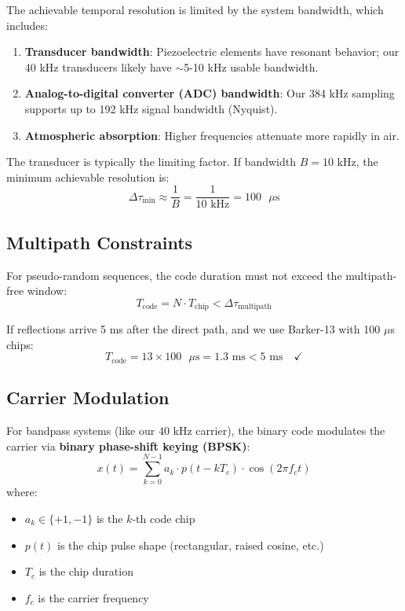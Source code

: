 \documentclass[11pt]{article}
\begin{document}
The achievable temporal resolution is limited by the system bandwidth, which includes:
\begin{enumerate}
    \item \textbf{Transducer bandwidth}: Piezoelectric elements have resonant behavior; our 40 kHz transducers likely have $\sim$5-10 kHz usable bandwidth.
    \item \textbf{Analog-to-digital converter (ADC) bandwidth}: Our 384 kHz sampling supports up to 192 kHz signal bandwidth (Nyquist).
    \item \textbf{Atmospheric absorption}: Higher frequencies attenuate more rapidly in air.
\end{enumerate}

The transducer is typically the limiting factor. If bandwidth $B = 10$ kHz, the minimum achievable resolution is:
\begin{equation}
\Delta \tau_{\min} \approx \frac{1}{B} = \frac{1}{10\text{ kHz}} = 100 \text{ }\mu\text{s}
\end{equation}

\subsection{Multipath Constraints}

For pseudo-random sequences, the code duration must not exceed the multipath-free window:
\begin{equation}
T_{\text{code}} = N \cdot T_{\text{chip}} < \Delta \tau_{\text{multipath}}
\end{equation}

If reflections arrive 5 ms after the direct path, and we use Barker-13 with 100 $\mu$s chips:
\begin{equation}
T_{\text{code}} = 13 \times 100 \text{ }\mu\text{s} = 1.3 \text{ ms} < 5 \text{ ms} \quad \checkmark
\end{equation}

\subsection{Carrier Modulation}

For bandpass systems (like our 40 kHz carrier), the binary code modulates the carrier via \textbf{binary phase-shift keying (BPSK)}:
\begin{equation}
x(t) = \sum_{k=0}^{N-1} a_k \cdot p(t - kT_c) \cdot \cos(2\pi f_c t)
\end{equation}
where:
\begin{itemize}
    \item $a_k \in \{+1, -1\}$ is the $k$-th code chip
    \item $p(t)$ is the chip pulse shape (rectangular, raised cosine, etc.)
    \item $T_c$ is the chip duration
    \item $f_c$ is the carrier frequency
\end{itemize}
\end{document}
